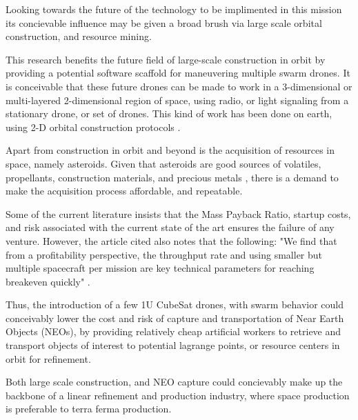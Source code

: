 Looking towards the future of the technology to be implimented in this
mission its concievable influence may be given a broad brush via large
scale orbital construction, and resource mining.

This research benefits the future field of large-scale construction in
orbit by providing a potential software scaffold for maneuvering
multiple swarm drones. It is conceivable that these future drones can
be made to work in a 3-dimensional or multi-layered 2-dimensional
region of space, using radio, or light signaling from a stationary
drone, or set of drones. This kind of work has been done on earth,
using 2-D orbital construction protocols \cite{Vardy:2018}.

Apart from construction in orbit and beyond is the acquisition of
resources in space, namely asteroids. Given that asteroids are good
sources of volatiles, propellants, construction materials, and
precious metals \cite{Ross:2020}, there is a demand to make the
acquisition process affordable, and repeatable.

Some of the current literature insists that the Mass Payback Ratio,
startup costs, and risk associated with the current state of the art
ensures the failure of any venture. However, the article cited also
notes that the following: "We find that from a profitability
perspective, the throughput rate and using smaller but multiple
spacecraft per mission are key technical parameters for reaching
breakeven quickly" \cite{Andreas:2001}.

Thus, the introduction of a few 1U CubeSat drones, with swarm behavior
could conceivably lower the cost and risk of capture and
transportation of Near Earth Objects (NEOs), by providing relatively
cheap artificial workers to retrieve and transport objects of interest
to potential lagrange points, or resource centers in orbit for
refinement.

Both large scale construction, and NEO capture could concievably make
up the backbone of a linear refinement and production industry, where
space production is preferable to terra ferma production.



